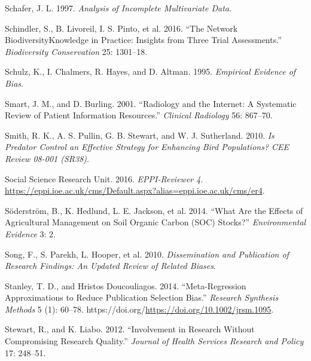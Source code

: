 \documentclass[
  letterpaper,
  DIV=11,
  numbers=noendperiod]{scrreprt}
\newlength{\cslhangindent}
\newenvironment{CSLReferences}[2] %
 {\begin{list}{}{%
  \setlength{\itemindent}{0pt}
  \setlength{\leftmargin}{0pt}
  \setlength{\parsep}{0pt}
  \ifodd #1
   \setlength{\leftmargin}{\cslhangindent}
   \setlength{\itemindent}{-1\cslhangindent}
  \fi
  \setlength{\itemsep}{#2\baselineskip}}}
 {\end{list}}
\begin{document}
\begin{CSLReferences}{1}{1}
Schafer, J. L. 1997. \emph{Analysis of Incomplete Multivariate Data}.

Schindler, S., B. Livoreil, I. S. Pinto, et al. 2016. {``The Network
BiodiversityKnowledge in Practice: Insights from Three Trial
Assessments.''} \emph{Biodiversity Conservation} 25: 1301--18.

Schulz, K., I. Chalmers, R. Hayes, and D. Altman. 1995. \emph{Empirical
Evidence of Bias}.

Smart, J. M., and D. Burling. 2001. {``Radiology and the Internet: A
Systematic Review of Patient Information Resources.''} \emph{Clinical
Radiology} 56: 867--70.

Smith, R. K., A. S. Pullin, G. B. Stewart, and W. J. Sutherland. 2010.
\emph{Is Predator Control an Effective Strategy for Enhancing Bird
Populations? CEE Review 08-001 (SR38)}.

Social Science Research Unit. 2016. \emph{EPPI-Reviewer 4}.
\url{https://eppi.ioe.ac.uk/cms/Default.aspx?alias=eppi.ioe.ac.uk/cms/er4}.

Söderström, B., K. Hedlund, L. E. Jackson, et al. 2014. {``What Are the
Effects of Agricultural Management on Soil Organic Carbon (SOC)
Stocks?''} \emph{Environmental Evidence} 3: 2.

Song, F., S. Parekh, L. Hooper, et al. 2010. \emph{Dissemination and
Publication of Research Findings: An Updated Review of Related Biases}.

Stanley, T. D., and Hristos Doucouliagos. 2014. {``Meta-Regression
Approximations to Reduce Publication Selection Bias.''} \emph{Research
Synthesis Methods} 5 (1): 60--78.
https://doi.org/\url{https://doi.org/10.1002/jrsm.1095}.

Stewart, R., and K. Liabo. 2012. {``Involvement in Research Without
Compromising Research Quality.''} \emph{Journal of Health Services
Research and Policy} 17: 248--51.


\end{CSLReferences}
\end{document}

